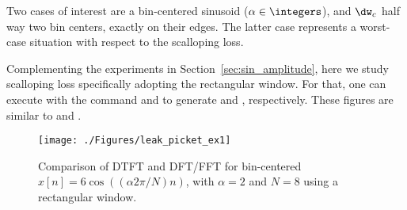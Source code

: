 


Two cases of interest are a bin-centered sinusoid ($\alpha \in \integers$), and $\dw_c$ half way two bin centers, exactly on their edges. The latter case represents a worst-case situation with respect to the scalloping loss.

Complementing the experiments in Section~\ref{sec:sin_amplitude}, here we study scalloping loss specifically adopting the rectangular window. For that, one can execute   with the command 
and  to generate 
 and , respectively. These figures are similar
to  and .


\begin{figure}[htbp]
\centering
\texttt{[image: ./Figures/leak\_picket\_ex1]}
\caption{Comparison of DTFT and DFT/FFT for bin-centered $x[n]=6\cos((\alpha 2 \pi /N) n)$, with $\alpha=2$ and $N=8$ using a rectangular window.\label{fig:leak_picket_ex1}}
\end{figure}

